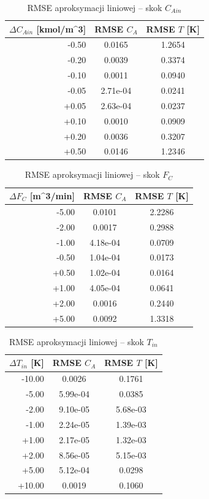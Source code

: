\begin{table}[H]
\centering
\caption{RMSE aproksymacji liniowej -- skok $C_{Ain}$}
\label{tab:1c_1}
\begin{tabular}{r|c|c}
\hline
$\Delta C_{Ain}$ [kmol/m^3] & RMSE $C_A$ & RMSE $T$ [K] \\
\hline
-0.50 & 0.0165 & 1.2654 \\
-0.20 & 0.0039 & 0.3374 \\
-0.10 & 0.0011 & 0.0940 \\
-0.05 & 2.71e-04 & 0.0241 \\
+0.05 & 2.63e-04 & 0.0237 \\
+0.10 & 0.0010 & 0.0909 \\
+0.20 & 0.0036 & 0.3207 \\
+0.50 & 0.0146 & 1.2346 \\
\hline
\end{tabular}
\end{table}

\begin{table}[H]
\centering
\caption{RMSE aproksymacji liniowej -- skok $F_C$}
\label{tab:1c_2}
\begin{tabular}{r|c|c}
\hline
$\Delta F_C$ [m^3/min] & RMSE $C_A$ & RMSE $T$ [K] \\
\hline
-5.00 & 0.0101 & 2.2286 \\
-2.00 & 0.0017 & 0.2988 \\
-1.00 & 4.18e-04 & 0.0709 \\
-0.50 & 1.04e-04 & 0.0173 \\
+0.50 & 1.02e-04 & 0.0164 \\
+1.00 & 4.05e-04 & 0.0641 \\
+2.00 & 0.0016 & 0.2440 \\
+5.00 & 0.0092 & 1.3318 \\
\hline
\end{tabular}
\end{table}

\begin{table}[H]
\centering
\caption{RMSE aproksymacji liniowej -- skok $T_{in}$}
\label{tab:1c_3}
\begin{tabular}{r|c|c}
\hline
$\Delta T_{in}$ [K] & RMSE $C_A$ & RMSE $T$ [K] \\
\hline
-10.00 & 0.0026 & 0.1761 \\
-5.00 & 5.99e-04 & 0.0385 \\
-2.00 & 9.10e-05 & 5.68e-03 \\
-1.00 & 2.24e-05 & 1.39e-03 \\
+1.00 & 2.17e-05 & 1.32e-03 \\
+2.00 & 8.56e-05 & 5.15e-03 \\
+5.00 & 5.12e-04 & 0.0298 \\
+10.00 & 0.0019 & 0.1060 \\
\hline
\end{tabular}
\end{table}

